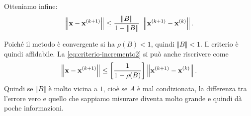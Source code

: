 Otteniamo infine:
\begin{equation}
\left\Vert \x -\x^{( k+1)}\right\Vert \leqslant \frac{\Vert B\Vert }{1-\Vert B\Vert } \ \left\Vert \x^{( k+1)} -\x^{(k)}\right\Vert.
\label{eq:criterio-incremento2}
\end{equation}

Poiché il metodo è convergente si ha $\rho (B) < 1$, quindi $\Vert B\Vert < 1$. Il criterio è quindi affidabile. La \eqref{eq:criterio-incremento2} si può anche riscrivere come
\begin{equation*}
\left\Vert \mathbf{x} -\mathbf{x}^{( k+1)}\right\Vert \leq \left[\frac{1}{1-\rho (B)}\right]\left\Vert \mathbf{x}^{( k+1)} -\mathbf{x}^{(k)}\right\Vert.
\end{equation*}
Quindi se $\Vert B\Vert $ è molto vicina a $1$, cioè se $A$ è mal condizionata, la differenza tra l'errore vero e quello che sappiamo misurare diventa molto grande e quindi dà poche informazioni.
